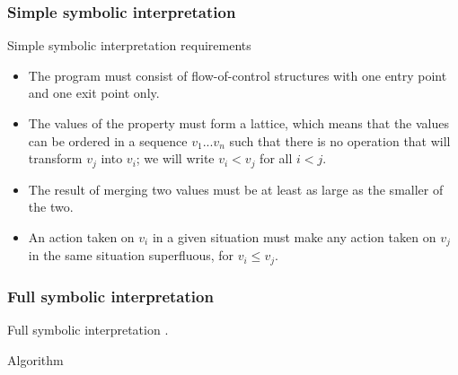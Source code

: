 \documentclass[presentation]{beamer}
\begin{document}
\begin{frame}
  \frametitle{Simple symbolic interpretation}
  \begin{block}{Simple symbolic interpretation requirements}
  \begin{itemize}
      \item The program must consist of flow-of-control structures with one entry point and one exit point only.
      \item The values of the property must form a lattice, which means that the values can be ordered in a sequence $v_1...v_n$ such that there is no operation that will transform $v_j$ into $v_i$; we will write $v_i < v_j$ for all $i<j$.
      \item The result of merging two values must be at least as large as the smaller of the two.
      \item An action taken on $v_i$ in a given situation must make any action taken on $v_j$ in the same situation superfluous, for $v_i \leq v_j$.
  \end{itemize}
  \end{block}
  \begin{block}{}
  \end{block}
\end{frame}

\begin{frame}
  \frametitle{Full symbolic interpretation}
  \begin{block}{Full symbolic interpretation}
  . 
  
  \end{block}
  
  \begin{block}{Algorithm}
  \end{block}
  
\end{frame}
\end{document}
